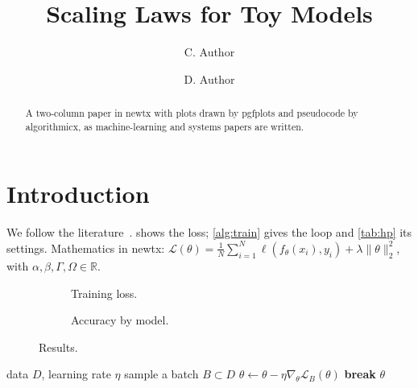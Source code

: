 \documentclass[10pt,twocolumn]{article}
\title{Scaling Laws for Toy Models}
\author{C. Author \and D. Author}
\date{}
\begin{document}
\maketitle
\begin{abstract}
A two-column paper in newtx with plots drawn by pgfplots and pseudocode
by algorithmicx, as machine-learning and systems papers are written.
\end{abstract}
\section{Introduction}
We follow the literature~\cite{shannon1948,knuth1984}. 
shows the loss; \cref{alg:train} gives the loop and \cref{tab:hp} its
settings. Mathematics in newtx: $\mathcal{L}(\theta) = \frac{1}{N}
\sum_{i=1}^{N} \ell(f_\theta(x_i), y_i) + \lambda \lVert\theta\rVert_2^2$,
with $\alpha, \beta, \Gamma, \Omega \in \mathbb{R}$.

\begin{figure}[t]
\centering
\begin{subfigure}{\columnwidth}
\centering
{}
\caption{Training loss.}\label{fig:loss-a}
\end{subfigure}
\begin{subfigure}{\columnwidth}
\centering
{}
\caption{Accuracy by model.}\label{fig:loss-b}
\end{subfigure}
\caption{Results.}\label{fig:loss}
\end{figure}

\begin{algorithm}[t]
\caption{Training loop}\label{alg:train}
\begin{algorithmic}[1]
\Require data $D$, learning rate $\eta$
  \State sample a batch $B \subset D$
  \State $\theta \gets \theta - \eta \nabla_\theta \mathcal{L}_B(\theta)$
    \State \textbf{break}
  \EndIf
\EndFor
\State \Return $\theta$
\end{algorithmic}
\end{algorithm}
\end{document}
